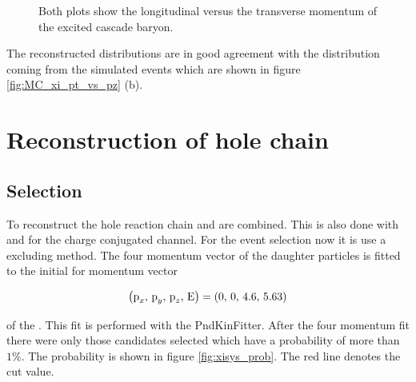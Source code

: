 	\begin{figure}
		\centering
		\caption{Both plots show the longitudinal versus the transverse momentum of the excited cascade baryon.}
		\label{fig:xi1820_pt_vs_pz}
	\end{figure}
	
	The reconstructed distributions are in good agreement with the distribution coming from the simulated events which are 
	shown in figure \ref{fig:MC_xi_pt_vs_pz} (b).
	
\section{Reconstruction of hole chain}

	\subsection*{Selection}
	
	To reconstruct the hole reaction chain \excitedcascade and \anticascade are combined.
	This is also done with \excitedanticascade and \cascade for the charge conjugated channel.
	For the event selection now it is use a excluding method. 
	The four momentum vector of the daughter particles is fitted to the initial for momentum vector  

	\begin{center}
		\begin{equation}\nonumber
			\left(\textnormal{p}_x,\, \textnormal{p}_y,\, \textnormal{p}_z,\, \textnormal{E} \right) = \left(0,\, 0,\, 4.6,\, 5.63 \right)
		\end{equation}
	\end{center}
	of the \pbarpSystem.	
	This fit is performed with the PndKinFitter.
	After the four momentum fit there were only those candidates selected which have a \chisq probability of more than $1\%$.
	The \chisq probability is shown in figure \ref{fig:xisys_prob}. 
	The red line denotes the cut value.

